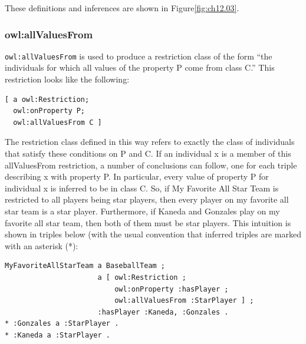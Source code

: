 These definitions and inferences are shown in Figure\ref{fig:ch12.03}.

\subsubsection{owl:allValuesFrom}

\texttt{owl:allValuesFrom} is used to produce a restriction class of the form
``the individuals for which all values of the property P come from class
C.'' This restriction looks like the following:

\begin{lstlisting}
[ a owl:Restriction; 
  owl:onProperty P;
  owl:allValuesFrom C ]
\end{lstlisting}

The restriction class defined in this way refers to exactly the class of
individuals that satisfy these conditions on P and C. If an individual x
is a member of this allValuesFrom restriction, a number of conclusions
can follow, one for each triple describing x with property P. In
particular, every value of property P for individual x is inferred to be
in class C. So, if My Favorite All Star Team is restricted to all players being star players, then every player on my favorite all star team is a star player.  Furthermore, if Kaneda and Gonzales play on my favorite all star team, then both of them must be star players.  This intuition is shown in triples below (with the usual convention that inferred triples are marked with an asterisk (*):

\begin{lstlisting}
MyFavoriteAllStarTeam a BaseballTeam ;
                      a [ owl:Restriction ;
		                  owl:onProperty :hasPlayer ;
		             	  owl:allValuesFrom :StarPlayer ] ;
                      :hasPlayer :Kaneda, :Gonzales .
* :Gonzales a :StarPlayer .
* :Kaneda a :StarPlayer .
\end{lstlisting}



